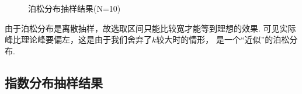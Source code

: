 \documentclass[12pt,a4paper,utf8]{ctexart}
\begin{document}
\begin{figure}[htb]
    \centering
    \hfill
    \hfill
    \hfill
    \caption{泊松分布抽样结果(N=10)}
\end{figure}

由于泊松分布是离散抽样，故选取区间只能比较宽才能等到理想的效果.
可见实际峰比理论峰要偏左，这是由于我们舍弃了$k$较大时的情形，
是一个“近似”的泊松分布. 

\subsection{指数分布抽样结果}
\end{document}
